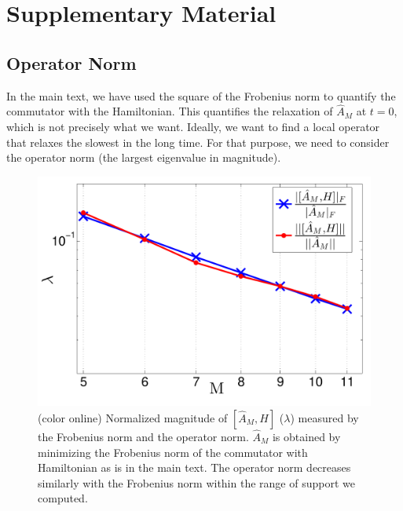 \documentclass[twocolumn,superscriptaddress, prb]{revtex4-1}
\begin{document}
\section*{Supplementary Material}

\subsection{Operator Norm}
In the main text, we have used the square of the Frobenius norm to quantify the commutator with the Hamiltonian.
This quantifies the relaxation of $\hat{A}_M$ at $t = 0$,
which is not precisely what we want. Ideally, we want to find a local operator
that relaxes the slowest in the long time.
For that purpose, we need to consider the operator norm (the largest eigenvalue in magnitude).

\begin{figure}
\includegraphics[width=1.0\linewidth]{op_norm.pdf}
\centering
\caption{(color online) Normalized magnitude of $[\hat{A}_M, H]$ ($\lambda$) measured by the Frobenius norm and the operator norm. 
$\hat{A}_M$ is obtained by minimizing the Frobenius norm of the commutator with Hamiltonian as is in the main text. 
The operator norm decreases similarly with the Frobenius norm within the range of support we computed. 
}
\label{fig:op_norm}
\end{figure}
\end{document}
